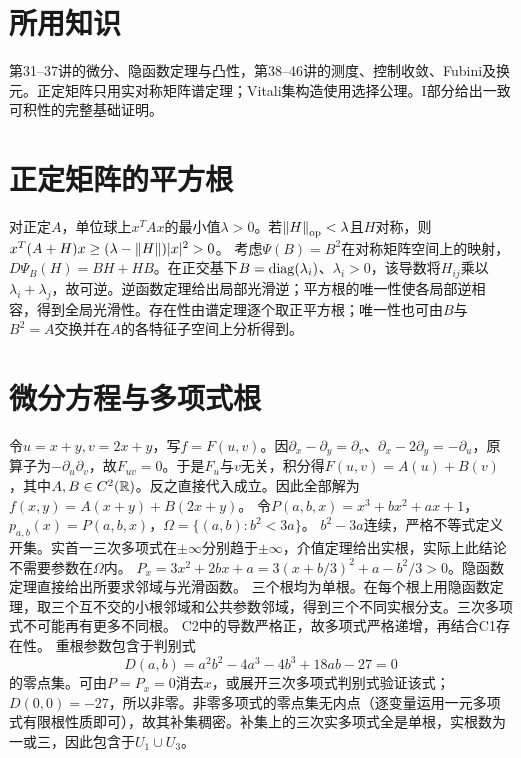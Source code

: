 \documentclass[UTF8,fontset=fandol,11pt]{ctexart}
\begin{document}
\section*{所用知识}
第31--37讲的微分、隐函数定理与凸性，第38--46讲的测度、控制收敛、Fubini及换元。正定矩阵只用实对称矩阵谱定理；Vitali集构造使用选择公理。I部分给出一致可积性的完整基础证明。
\section{正定矩阵的平方根}
对正定$A$，单位球上$x^TAx$的最小值$\lambda>0$。若$\left\lVert H\right\rVert_{\rm op}<\lambda$且$H$对称，则$x^T(A+H)x\ge(\lambda-\left\lVert H\right\rVert)|x|^2>0$。
考虑$\Psi(B)=B^2$在对称矩阵空间上的映射，$D\Psi_B(H)=BH+HB$。在正交基下$B=\operatorname{diag}(\lambda_i)$、$\lambda_i>0$，该导数将$H_{ij}$乘以$\lambda_i+\lambda_j$，故可逆。逆函数定理给出局部光滑逆；平方根的唯一性使各局部逆相容，得到全局光滑性。存在性由谱定理逐个取正平方根；唯一性也可由$B$与$B^2=A$交换并在$A$的各特征子空间上分析得到。
\section{微分方程与多项式根}
令$u=x+y,v=2x+y$，写$f=F(u,v)$。因$\partial_x-\partial_y=\partial_v$、$\partial_x-2\partial_y=-\partial_u$，原算子为$-\partial_u\partial_v$，故$F_{uv}=0$。于是$F_u$与$v$无关，积分得$F(u,v)=A(u)+B(v)$，其中$A,B\in C^2(\mathbb R)$。反之直接代入成立。因此全部解为$f(x,y)=A(x+y)+B(2x+y)$。
令$P(a,b,x)=x^3+bx^2+ax+1$，$p_{a,b}(x)=P(a,b,x)$，$\Omega=\{(a,b):b^2<3a\}$。
$b^2-3a$连续，严格不等式定义开集。实首一三次多项式在$\pm\infty$分别趋于$\pm\infty$，介值定理给出实根，实际上此结论不需要参数在$\Omega$内。
$P_x=3x^2+2bx+a=3(x+b/3)^2+a-b^2/3>0$。隐函数定理直接给出所要求邻域与光滑函数。
三个根均为单根。在每个根上用隐函数定理，取三个互不交的小根邻域和公共参数邻域，得到三个不同实根分支。三次多项式不可能再有更多不同根。
C2中的导数严格正，故多项式严格递增，再结合C1存在性。
重根参数包含于判别式
\[D(a,b)=a^2b^2-4a^3-4b^3+18ab-27=0\]
的零点集。可由$P=P_x=0$消去$x$，或展开三次多项式判别式验证该式；$D(0,0)=-27$，所以非零。非零多项式的零点集无内点（逐变量运用一元多项式有限根性质即可），故其补集稠密。补集上的三次实多项式全是单根，实根数为一或三，因此包含于$U_1\cup U_3$。
\end{document}
